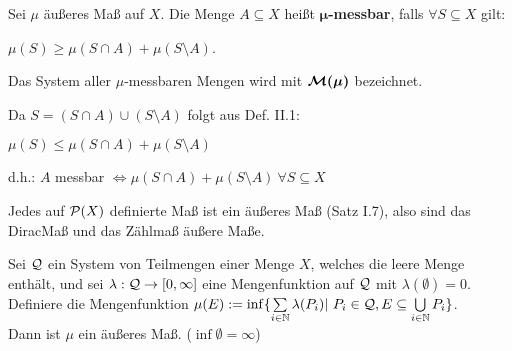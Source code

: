 \documentclass[11pt,a4paper,fleqn,openany]{report}
\begin{document}
    \begin{definition}
      Sei $\mu$ äußeres Maß auf $X$. Die Menge $A \subseteq X$ heißt \textbf{$\bm{\mu}$-messbar}, falls $\forall S \subseteq X$ gilt:
      \begin{center}
        $\mu(S) \geq \mu(S \cap A) + \mu(S \setminus A)$.
      \end{center}
      Das System aller $\mu$-messbaren Mengen wird mit $\bm{\mathcal{M}(\mu)}$ bezeichnet.
    \end{definition}

    \begin{remark}
      Da $S = (S \cap A) \cup (S \setminus A)$ folgt aus Def. II.1:
      \begin{center}
        $\mu(S) \leq \mu(S \cap A) + \mu(S \setminus A)$
      \end{center}
      d.h.: $A$ messbar $\Leftrightarrow \mu(S \cap A) + \mu(S \setminus A) \ \forall S \subseteq X$ 
    \end{remark}

    \begin{example}
      Jedes auf $\mathcal{P}(X)$ definierte Maß ist ein äußeres Maß (Satz I.7), also sind das DiracMaß und das Zählmaß äußere Maße.
    \end{example}

    \newpage
    \begin{theorem}
      Sei $\mathcal{Q}$ ein System von Teilmengen einer Menge $X$, welches die leere Menge enthält, und sei $\lambda: \mathcal{Q} \to [0,\infty]$ eine Mengenfunktion auf $\mathcal{Q}$ mit $\lambda(\emptyset)=0$. Definiere die Mengenfunktion $\mu(E):= \inf\{\sum\limits_{i \in \mathbb{N}} \lambda(P_i) |\ P_i \in \mathcal{Q}, E \subseteq \bigcup\limits_{i \in \mathbb{N}} P_i\}$.\\
      Dann ist $\mu$ ein äußeres Maß. \hfill ($\inf \emptyset = \infty$)
    \end{theorem}
\end{document}
